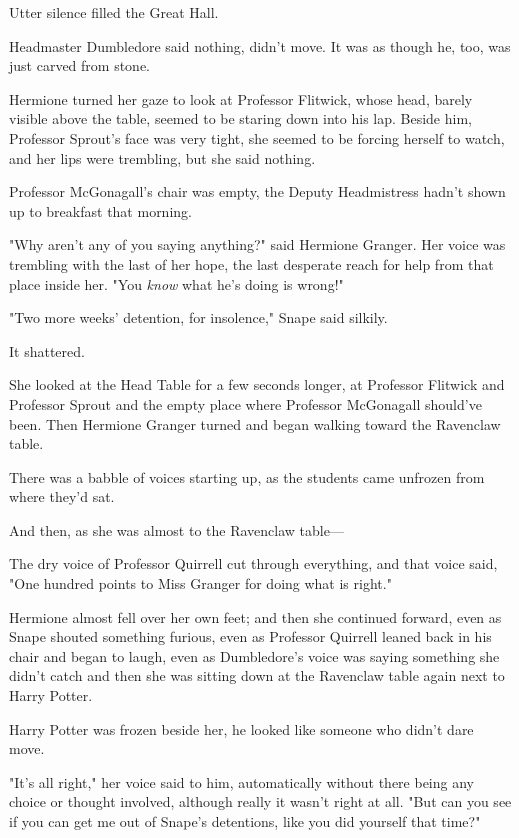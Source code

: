 Utter silence filled the Great Hall.

Headmaster Dumbledore said nothing, didn't move. It was as though he, too, was 
just carved from stone.

Hermione turned her gaze to look at Professor Flitwick, whose head, barely 
visible above the table, seemed to be staring down into his lap. Beside him, 
Professor Sprout's face was very tight, she seemed to be forcing herself to 
watch, and her lips were trembling, but she said nothing.

Professor McGonagall's chair was empty, the Deputy Headmistress hadn't shown up 
to breakfast that morning.

"Why aren't any of you saying anything?" said Hermione Granger. Her voice was 
trembling with the last of her hope, the last desperate reach for help from 
that place inside her. "You \emph{know} what he's doing is wrong!"

"Two more weeks' detention, for insolence," Snape said silkily.

It shattered.

She looked at the Head Table for a few seconds longer, at Professor Flitwick 
and Professor Sprout and the empty place where Professor McGonagall should've 
been. Then Hermione Granger turned and began walking toward the Ravenclaw table.

There was a babble of voices starting up, as the students came unfrozen from 
where they'd sat.

And then, as she was almost to the Ravenclaw table---

The dry voice of Professor Quirrell cut through everything, and that voice 
said, "One hundred points to Miss Granger for doing what is right."

Hermione almost fell over her own feet; and then she continued forward, even as 
Snape shouted something furious, even as Professor Quirrell leaned back in his 
chair and began to laugh, even as Dumbledore's voice was saying something she 
didn't catch and then she was sitting down at the Ravenclaw table again next to 
Harry Potter.

Harry Potter was frozen beside her, he looked like someone who didn't dare move.

"It's all right," her voice said to him, automatically without there being any 
choice or thought involved, although really it wasn't right at all. "But can 
you see if you can get me out of Snape's detentions, like you did yourself that 
time?"

